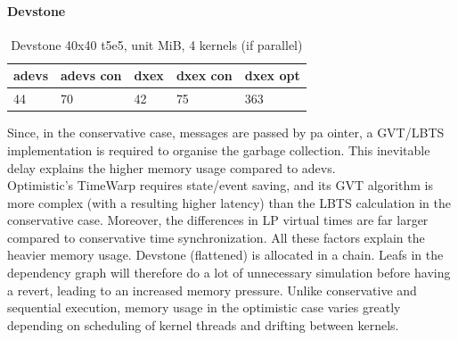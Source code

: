 \paragraph*{Devstone}
\begin{table}[htb]
	\centering
	\begin{tabular}{| l | l | l | l | l |}
		\hline
		adevs & adevs con &dxex &dxex con&dxex opt\\ \hline
		44 & 70 & 42 & 75 & 363  \\ \hline
	\end{tabular}
	\caption{Devstone 40x40 t5e5, unit MiB, 4 kernels (if parallel)}
\end{table}
Since, in the conservative case, messages are passed by pa ointer, a GVT/LBTS implementation is required to organise the garbage collection. This inevitable delay explains the higher memory usage compared to adevs.\\
Optimistic's TimeWarp requires state/event saving, and its GVT algorithm is more complex (with a resulting higher latency) than the LBTS calculation in the conservative case. 
Moreover, the differences in LP virtual times are far larger compared to conservative time synchronization. All these factors explain the heavier memory usage. Devstone (flattened) is allocated in a chain. Leafs in the dependency graph will therefore do a lot of unnecessary simulation before having a revert, leading to an increased memory pressure. Unlike conservative and sequential execution, memory usage in the optimistic case varies greatly depending on scheduling of kernel threads and drifting between kernels. 
